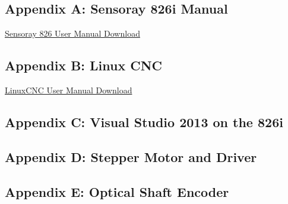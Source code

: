 \documentclass[12pt]{article}
\begin{document}
\clearpage

\subsection*{Appendix A: Sensoray 826i Manual}


\href{http://www.sensoray.com/downloads/man_826_hw_3.0.5.pdf}{Sensoray 826 User Manual Download}
%




\subsection*{Appendix B: Linux CNC}


\href{http://www.linuxcnc.org/docs/2.6/pdf/LinuxCNC_User_Manual.pdf}{LinuxCNC User Manual Download}
%

%

%


\subsection*{Appendix C: Visual Studio 2013 on the 826i}






\subsection*{Appendix D: Stepper Motor and Driver}








\subsection*{Appendix E: Optical Shaft Encoder}


\end{document}
